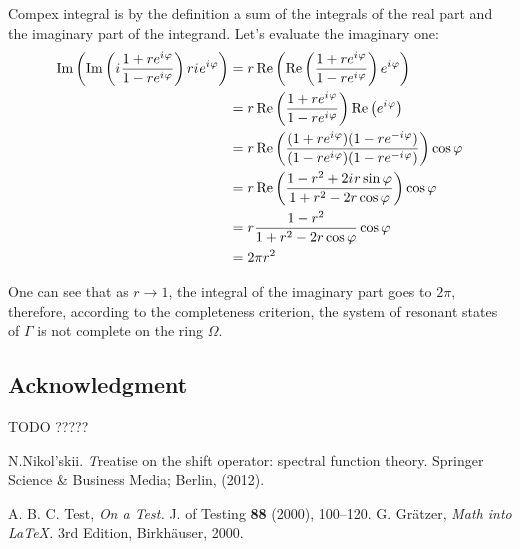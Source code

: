 \documentclass{birkjour}
\theoremstyle{definition}
\theoremstyle{remark}
\numberwithin{equation}{section}
\newcommand{\eexp}[1]{e^{#1}}
\newcommand{\iu}{{i\mkern1mu}}
\renewcommand{\Re}{\operatorname{Re}}
\renewcommand{\Im}{\operatorname{Im}}
\renewcommand{\phi}{\varphi}
\begin{document}
Compex integral is by the definition a sum of the integrals of the real part and the imaginary part of the integrand. Let's evaluate the imaginary one:
\begin{align*}
\Im \left(  \Im \left( \iu \frac{1 + r \eexp{\iu \phi}}{1 - r \eexp{\iu \phi}} \right) r \iu \eexp{\iu \phi} \right)
 &= r \Re \left(  \Re \left( \frac{1 + r \eexp{\iu \phi}}{1 - r \eexp{\iu \phi}} \right) \eexp{\iu \phi} \right) \\
 &= r \Re \left( \frac{1 + r \eexp{\iu \phi}}{1 - r \eexp{\iu \phi}} \right) \Re \left(   \eexp{\iu \phi} \right) \\
 &= r \Re \left( \frac{(1 + r \eexp{\iu \phi}) (1 - r \eexp{-\iu \phi}) }{(1 - r \eexp{\iu \phi}) (1 - r \eexp{-\iu \phi})} \right) \cos \phi \\
 &= r \Re \left( \frac{1 - r^2 + 2 \iu r \sin \phi}{1 + r^2 - 2 r \cos \phi} \right) \cos \phi \\
 &= r \frac{1 - r^2}{1 + r^2 - 2 r \cos \phi} \cos \phi \\
 &= 2 \pi r^2
\end{align*}

One can see that as $r \to 1$, the integral of the imaginary part goes to $2 \pi$, therefore, according to the completeness criterion, the system of resonant states of $\Gamma$ is not complete on the ring $\Omega$.


\subsection*{Acknowledgment}
TODO ?????


\begin{thebibliography}{1}
N.Nikol'skii. {\textit Treatise on the shift operator: spectral
function theory}. Springer Science \& Business Media; Berlin,
(2012).

 A. B. C. Test, \textit{On a Test.} J. of Testing
\textbf{88} (2000), 100--120.
 G. Gr\"atzer, \textit{Math into \LaTeX.} 3rd Edition,
Birkh\"auser, 2000.
\end{thebibliography}

\end{document}

